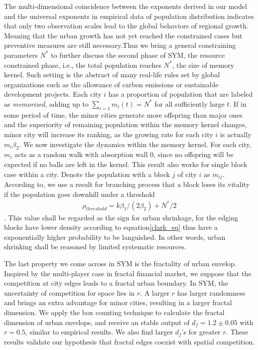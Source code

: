 \documentclass[reprint,unsortedaddress,amsmath,amssymb,aps,prl,fixfloat,showkeys]{revtex4-2}
\begin{document}
The multi-dimensional coincidence between the exponents derived in our model and the universal exponents in empirical data of population distribution indicates that only two observation scales lead to the global behaviors of regional growth. Meaning that the urban growth has not yet reached the constrained cases but preventive measures are still necessary.Thus we bring a general constraining parameters $N^*$ to further discuss the second phase of SYM, the resource constrained phase, i.e., the total population reaches $N^*$, the size of memory kernel. Such setting is the abstract of many real-life rules set by global organizations such as the allowance of carbon emissions or sustainable development projects. Each city $i$ has a proportion of population that are labeled as \emph{memorized}, adding up to $\sum_{i=1} m_i(t) = N^*$ for all sufficiently large $t$. If in some period of time, the minor cities generate more offspring than major ones and the superiority of remaining population within the memory kernel changes, minor city will increase its ranking, as the growing rate for each city $i$ is actually $m_i\beta_2$. We now investigate the dynamics within the memory kernel. For each city, $m_i$ acts as a random walk with absorption wall $0$, since no offspring will be expected if no balls are left in the kernel. This result also works for single block case within a city. Denote the population with a block $j$ of city $i$ as $m_{ij}$. According to\@\cite{durrett1999essentials}, we use a result for branching process that a block loses its vitality if the population goes downhill under a threshold \begin{align}\rho_{threshold} = k\beta_1/(2\beta_2)+N^*/2\end{align}. This value shall be regarded as the sign for urban shrinkage, for the edging blocks have lower density according to equation\ref{clark_eq} thus have a exponentially higher probability to be languished. In other words, urban shrinking shall be reasoned by limited systematic resources.

The last property we come across in SYM is the fractality of urban envelop. Inspired by the multi-player case in fractal financial market, we suppose that the competition at city edges leads to a fractal urban boundary. In SYM, the uncertainty of competition for space lies in $r$. A larger $r$ has larger randomness and brings an extra advantage for minor cities, resulting in a larger fractal dimension. We apply the box counting technique to calculate the fractal dimension of urban envelops, and receive an stable output of $d_f = 1.2\pm 0.05$ with $r = 0.5$, similar to empirical results\cite{batty1992form}. We also find larger $d_f$'s for greater $r$. These results validate our hypothesis that fractal edges coexist with spatial competition. 
\end{document}

